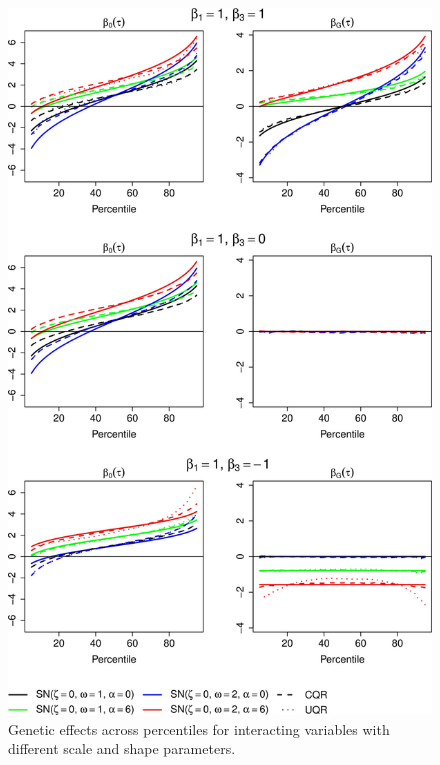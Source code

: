 \documentclass[12pt]{article}
\begin{document}
\begin{appendices}
\begin{figure}[h!]
	\centering
	\includegraphics[width=0.75 \textwidth, height=1.25\textwidth]{Figures/QR_EXAMPLE_July148.jpg}
	\caption{Genetic effects across percentiles for interacting variables with different scale and shape parameters.}
	\label{fig:MotExample}
\end{figure}


\end{appendices}
\end{document}
